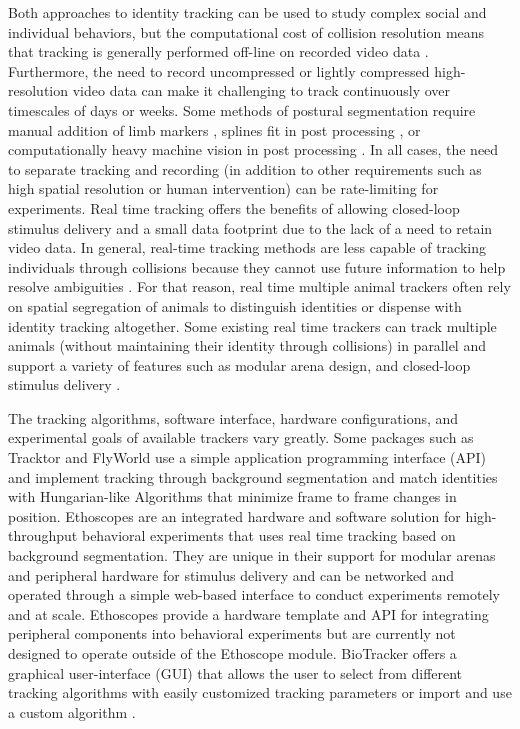 \documentclass[10pt]{article}
\begin{document}
\begin{multicols}{2}
Both approaches to identity tracking can be used to study complex social and individual behaviors, but the computational cost of collision resolution means that tracking is generally performed off-line on recorded video data \cite{Liu_A_2018}. Furthermore, the need to record uncompressed or lightly compressed high-resolution video data can make it challenging to track continuously over timescales of days or weeks. Some methods of postural segmentation require manual addition of limb markers \cite{Kain_Leg_2013}, splines fit in post processing \cite{Uhlmann_FlyLimbTracker_2017}, or computationally heavy machine vision in post processing \cite{Mathis_DeepLabCut_2018,Pereira_Fast_2018}. In all cases, the need to separate tracking and recording (in addition to other requirements such as high spatial resolution or human intervention) can be rate-limiting for experiments. Real time tracking offers the benefits of allowing closed-loop stimulus delivery and a small data footprint due to the lack of a need to retain video data. In general, real-time tracking methods are less capable of tracking individuals through collisions because they cannot use future information to help resolve ambiguities \cite{Itskovits_A_2017}. For that reason, real time multiple animal trackers often rely on spatial segregation of animals to distinguish identities or dispense with identity tracking altogether\cite{Liu_A_2018}. Some existing real time trackers can track multiple animals (without maintaining their identity through collisions) in parallel and support a variety of features such as modular arena design, and closed-loop stimulus delivery \cite{Geissmann_Ethoscopes_2017,Straw_Multi_2011,Stowers_Virtual_2017,Chagas_The_2017}.

The tracking algorithms, software interface, hardware configurations, and experimental goals of available trackers vary greatly. Some packages such as Tracktor and FlyWorld use a simple application programming interface (API) and implement tracking through background segmentation and match identities with Hungarian-like Algorithms that minimize frame to frame changes in position. Ethoscopes are an integrated hardware and software solution for high-throughput behavioral experiments that uses real time tracking based on background segmentation. They are unique in their support for modular arenas and peripheral hardware for stimulus delivery \cite{Geissmann_Ethoscopes_2017} and can be networked and operated through a simple web-based interface to conduct experiments remotely and at scale. Ethoscopes provide a hardware template and API for integrating peripheral components into behavioral experiments but are currently not designed to operate outside of the Ethoscope module.  BioTracker offers a graphical user-interface (GUI) that allows the user to select from different tracking algorithms with easily customized tracking parameters or import and use a custom algorithm \cite{Mnck_BioTracker_2018}. 


\end{multicols}
\end{document}
